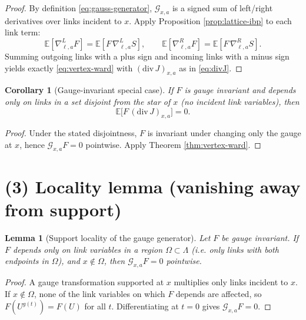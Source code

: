 \documentclass[11pt]{article}
\newtheorem{lemma}[theorem]{Lemma}
\newtheorem{corollary}[theorem]{Corollary}
\theoremstyle{definition}
\newcommand{\E}{\mathbb{E}}
\newcommand{\1}{\mathbf{1}}
\begin{document}
\begin{proof}
By definition \eqref{eq:gauss-generator}, $\mathcal{G}_{x,a}$ is a signed sum of left/right derivatives over links incident to $x$.
Apply Proposition \ref{prop:lattice-ibp} to each link term:
\begin{equation*}
\E[\nabla^{L}_{\ell,a}F]=\E[F\,\nabla^{L}_{\ell,a}S],\qquad
\E[\nabla^{R}_{\ell,a}F]=\E[F\,\nabla^{R}_{\ell,a}S].
\end{equation*}
Summing outgoing links with a plus sign and incoming links with a minus sign yields exactly \eqref{eq:vertex-ward} with $(\mathrm{div}\,J)_{x,a}$ as in \eqref{eq:divJ}.
\end{proof}

\begin{corollary}[Gauge-invariant special case]\label{cor:gauge-inv-special}
If $F$ is gauge invariant and depends only on links in a set disjoint from the star of $x$ (no incident link variables), then
\begin{equation}\label{eq:ward-offsupport}
  \E\big[F\,(\mathrm{div}\,J)_{x,a}\big]=0.
\end{equation}
\end{corollary}

\begin{proof}
Under the stated disjointness, $F$ is invariant under changing only the gauge at $x$, hence $\mathcal{G}_{x,a}F=0$ pointwise.
Apply Theorem \ref{thm:vertex-ward}.
\end{proof}

\section{(3) Locality lemma (vanishing away from support)}

\begin{lemma}[Support locality of the gauge generator]\label{lem:locality}
Let $F$ be gauge invariant.
If $F$ depends only on link variables in a region $\Omega\subset \Lambda$ (i.e. only links with both endpoints in $\Omega$), and $x\notin \Omega$, then $\mathcal{G}_{x,a}F=0$ pointwise.
\end{lemma}

\begin{proof}
A gauge transformation supported at $x$ multiplies only links incident to $x$.
If $x\notin\Omega$, none of the link variables on which $F$ depends are affected, so $F(U^{g(t)})=F(U)$ for all $t$.
Differentiating at $t=0$ gives $\mathcal{G}_{x,a}F=0$.
\end{proof}
\end{document}
